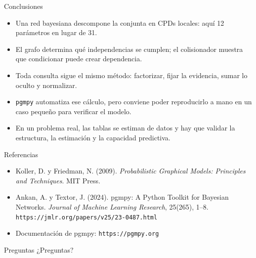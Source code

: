 \documentclass[11pt]{beamer}
\begin{document}
\begin{frame}{Conclusiones}
  \begin{itemize}
    \item Una red bayesiana descompone la conjunta en CPDs locales: aquí 12 parámetros en lugar de 31.
    \item El grafo determina qué independencias se cumplen; el colisionador muestra que condicionar puede crear dependencia.
    \item Toda consulta sigue el mismo método: factorizar, fijar la evidencia, sumar lo oculto y normalizar.
    \item \texttt{pgmpy} automatiza ese cálculo, pero conviene poder reproducirlo a mano en un caso pequeño para verificar el modelo.
    \item En un problema real, las tablas se estiman de datos y hay que validar la estructura, la estimación y la capacidad predictiva.
  \end{itemize}
\end{frame}

\begin{frame}{Referencias}
  \small
  \begin{itemize}
    \item Koller, D. y Friedman, N. (2009). \emph{Probabilistic Graphical Models: Principles and Techniques}. MIT Press.
    \item Ankan, A. y Textor, J. (2024). pgmpy: A Python Toolkit for Bayesian Networks. \emph{Journal of Machine Learning Research}, 25(265), 1--8. \texttt{https://jmlr.org/papers/v25/23-0487.html}
    \item Documentación de pgmpy: \texttt{https://pgmpy.org}
  \end{itemize}
\end{frame}

\begin{frame}{Preguntas}
  \centering
  \Large ¿Preguntas?
\end{frame}
\end{document}
